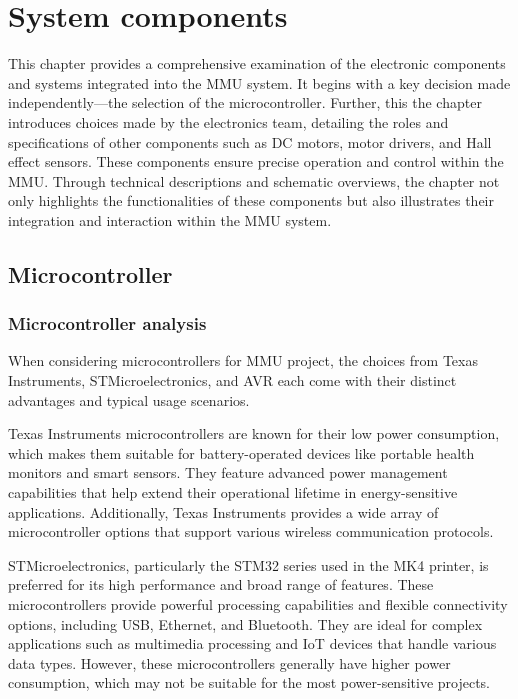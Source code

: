 \chapter{System components}

This chapter provides a comprehensive examination of the electronic components and systems integrated into the MMU system. It begins with a key decision made independently—the selection of the microcontroller. Further, this the chapter introduces choices made by the electronics team, detailing the roles and specifications of other components such as DC motors, motor drivers, and Hall effect sensors. These components ensure precise operation and control within the MMU. Through technical descriptions and schematic overviews, the chapter not only highlights the functionalities of these components but also illustrates their integration and interaction within the MMU system.

\section{Microcontroller}

\subsection{Microcontroller analysis}

When considering microcontrollers for MMU project, the choices from Texas Instruments, STMicroelectronics, and AVR each come with their distinct advantages and typical usage scenarios.

Texas Instruments microcontrollers are known for their low power consumption, which makes them suitable for battery-operated devices like portable health monitors and smart sensors. They feature advanced power management capabilities that help extend their operational lifetime in energy-sensitive applications. Additionally, Texas Instruments provides a wide array of microcontroller options that support various wireless communication protocols.

STMicroelectronics, particularly the STM32 series used in the MK4 printer, is preferred for its high performance and broad range of features. These microcontrollers provide powerful processing capabilities and flexible connectivity options, including USB, Ethernet, and Bluetooth. They are ideal for complex applications such as multimedia processing and IoT devices that handle various data types. However, these microcontrollers generally have higher power consumption, which may not be suitable for the most power-sensitive projects.

